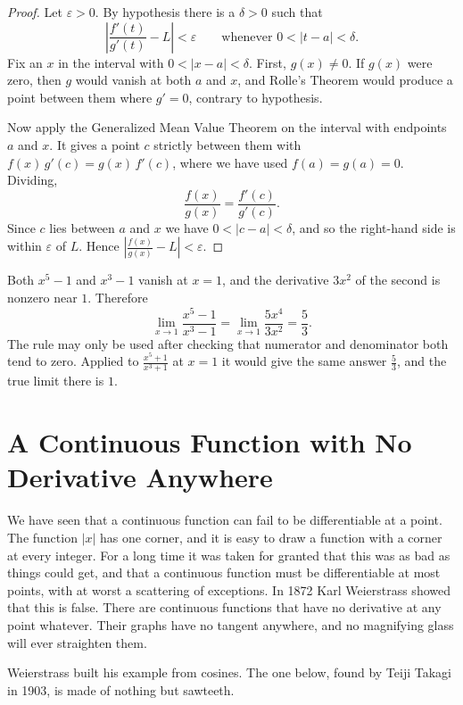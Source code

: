 \begin{proof}
Let $\varepsilon > 0$.  By hypothesis there is a $\delta > 0$ such that
\[ \left|\frac{f'(t)}{g'(t)} - L\right| < \varepsilon \qquad \text{whenever } 0 < |t - a| < \delta. \]
Fix an $x$ in the interval with $0 < |x - a| < \delta$.  First, $g(x) \neq 0$.  If $g(x)$ were zero, then $g$ would vanish at both $a$ and $x$, and Rolle's Theorem would produce a point between them where $g' = 0$, contrary to hypothesis.

Now apply the Generalized Mean Value Theorem on the interval with endpoints $a$ and $x$.  It gives a point $c$ strictly between them with $f(x)\,g'(c) = g(x)\,f'(c)$, where we have used $f(a) = g(a) = 0$.  Dividing,
\[ \frac{f(x)}{g(x)} = \frac{f'(c)}{g'(c)}. \]
Since $c$ lies between $a$ and $x$ we have $0 < |c - a| < \delta$, and so the right-hand side is within $\varepsilon$ of $L$.  Hence $\left|\frac{f(x)}{g(x)} - L\right| < \varepsilon$.
\end{proof}

\begin{example}
Both $x^5 - 1$ and $x^3 - 1$ vanish at $x = 1$, and the derivative $3x^2$ of the second is nonzero near $1$.  Therefore
\[ \lim_{x \to 1} \frac{x^5 - 1}{x^3 - 1} = \lim_{x \to 1} \frac{5x^4}{3x^2} = \frac53. \]
The rule may only be used after checking that numerator and denominator both tend to zero.  Applied to $\frac{x^5 + 1}{x^3 + 1}$ at $x = 1$ it would give the same answer $\frac53$, and the true limit there is $1$.
\end{example}

\section{A Continuous Function with No Derivative Anywhere}

We have seen that a continuous function can fail to be differentiable at a point.  The function $|x|$ has one corner, and it is easy to draw a function with a corner at every integer.  For a long time it was taken for granted that this was as bad as things could get, and that a continuous function must be differentiable at most points, with at worst a scattering of exceptions.  In 1872 Karl Weierstrass showed that this is false.  There are continuous functions that have no derivative at any point whatever.  Their graphs have no tangent anywhere, and no magnifying glass will ever straighten them.

Weierstrass built his example from cosines.  The one below, found by Teiji Takagi in 1903, is made of nothing but sawteeth.

